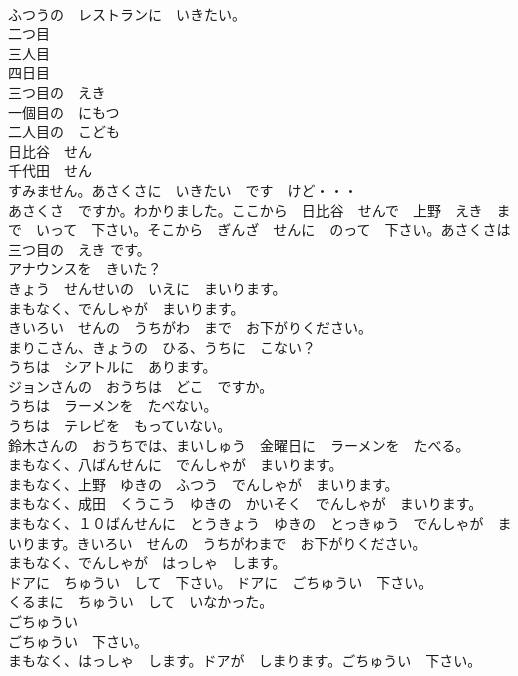 \documentclass[8pt]{extreport}
\begin{document}
\begin{CJK}{UTF8}{min}
\\	ふつうの　レストランに　いきたい。	
\\	二つ目	
\\	三人目	
\\	四日目	
\\	三つ目の　えき	
\\	一個目の　にもつ	
\\	二人目の　こども	
\\	日比谷　せん	
\\	千代田　せん	
\\	すみません。あさくさに　いきたい　です　けど・・・	
\\	あさくさ　ですか。わかりました。ここから　日比谷　せんで　上野　えき　まで　いって　下さい。そこから　ぎんざ　せんに　のって　下さい。あさくさは　三つ目の　えき です。	
\\	アナウンスを　きいた？	
\\	きょう　せんせいの　いえに　まいります。	
\\	まもなく、でんしゃが　まいります。	
\\	きいろい　せんの　うちがわ　まで　お下がりください。	
\\	まりこさん、きょうの　ひる、うちに　こない？	
\\	うちは　シアトルに　あります。	
\\	ジョンさんの　おうちは　どこ　ですか。	
\\	うちは　ラーメンを　たべない。	
\\	うちは　テレビを　もっていない。	
\\	鈴木さんの　おうちでは、まいしゅう　金曜日に　ラーメンを　たべる。	
\\	まもなく、八ばんせんに　でんしゃが　まいります。	
\\	まもなく、上野　ゆきの　ふつう　でんしゃが　まいります。	
\\	まもなく、成田　くうこう　ゆきの　かいそく　でんしゃが　まいります。	
\\	まもなく、１０ばんせんに　とうきょう　ゆきの　とっきゅう　でんしゃが　まいります。きいろい　せんの　うちがわまで　お下がりください。	
\\	まもなく、でんしゃが　はっしゃ　します。	
\\	ドアに　ちゅうい　して　下さい。 ドアに　ごちゅうい　下さい。	
\\	くるまに　ちゅうい　して　いなかった。	
\\	ごちゅうい	
\\	ごちゅうい　下さい。	
\\	まもなく、はっしゃ　します。ドアが　しまります。ごちゅうい　下さい。	

\end{CJK}
\end{document}
